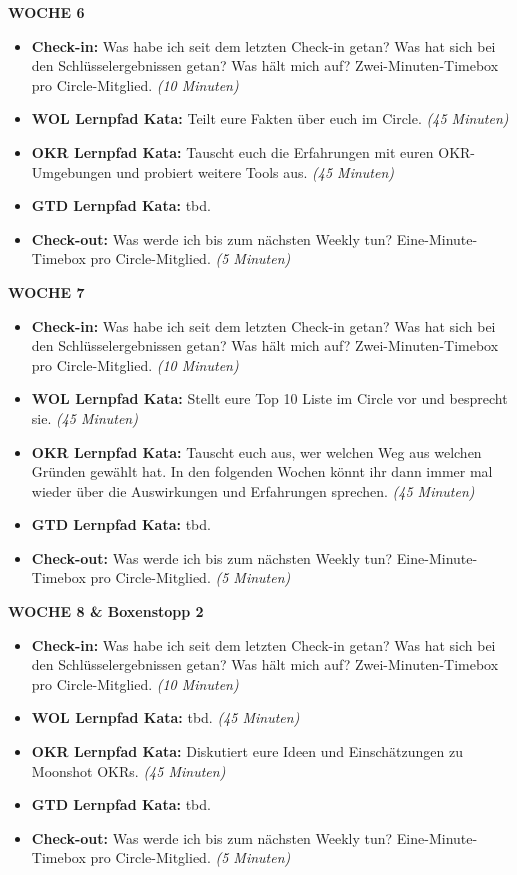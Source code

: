 \documentclass[
  ngerman,
  paper=a4,
,captions=tableheading
]{scrartcl}
\providecommand{\tightlist}{%
  \setlength{\itemsep}{0pt}\setlength{\parskip}{0pt}}
\begin{document}
\textbf{WOCHE 6}

\begin{itemize}
\tightlist
\item
  \textbf{Check-in:} Was habe ich seit dem letzten Check-in getan? Was
  hat sich bei den Schlüsselergebnissen getan? Was hält mich auf?
  Zwei-Minuten-Timebox pro Circle-Mitglied. \emph{(10 Minuten)}
\item
  \textbf{WOL Lernpfad Kata:} Teilt eure Fakten über euch im Circle.
  \emph{(45 Minuten)}
\item
  \textbf{OKR Lernpfad Kata:} Tauscht euch die Erfahrungen mit euren
  OKR-Umgebungen und probiert weitere Tools aus. \emph{(45 Minuten)}
\item
  \textbf{GTD Lernpfad Kata:} tbd.
\item
  \textbf{Check-out:} Was werde ich bis zum nächsten Weekly tun?
  Eine-Minute-Timebox pro Circle-Mitglied. \emph{(5 Minuten)}
\end{itemize}

\textbf{WOCHE 7}

\begin{itemize}
\tightlist
\item
  \textbf{Check-in:} Was habe ich seit dem letzten Check-in getan? Was
  hat sich bei den Schlüsselergebnissen getan? Was hält mich auf?
  Zwei-Minuten-Timebox pro Circle-Mitglied. \emph{(10 Minuten)}
\item
  \textbf{WOL Lernpfad Kata:} Stellt eure Top 10 Liste im Circle vor und
  besprecht sie. \emph{(45 Minuten)}
\item
  \textbf{OKR Lernpfad Kata:} Tauscht euch aus, wer welchen Weg aus
  welchen Gründen gewählt hat. In den folgenden Wochen könnt ihr dann
  immer mal wieder über die Auswirkungen und Erfahrungen sprechen.
  \emph{(45 Minuten)}
\item
  \textbf{GTD Lernpfad Kata:} tbd.
\item
  \textbf{Check-out:} Was werde ich bis zum nächsten Weekly tun?
  Eine-Minute-Timebox pro Circle-Mitglied. \emph{(5 Minuten)}
\end{itemize}

\textbf{WOCHE 8 \& Boxenstopp 2}

\begin{itemize}
\tightlist
\item
  \textbf{Check-in:} Was habe ich seit dem letzten Check-in getan? Was
  hat sich bei den Schlüsselergebnissen getan? Was hält mich auf?
  Zwei-Minuten-Timebox pro Circle-Mitglied. \emph{(10 Minuten)}
\item
  \textbf{WOL Lernpfad Kata:} tbd. \emph{(45 Minuten)}
\item
  \textbf{OKR Lernpfad Kata:} Diskutiert eure Ideen und Einschätzungen
  zu Moonshot OKRs. \emph{(45 Minuten)}
\item
  \textbf{GTD Lernpfad Kata:} tbd.
\item
  \textbf{Check-out:} Was werde ich bis zum nächsten Weekly tun?
  Eine-Minute-Timebox pro Circle-Mitglied. \emph{(5 Minuten)}
\end{itemize}
\end{document}
